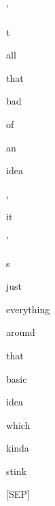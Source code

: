 \documentclass[varwidth=150mm]{standalone}
\begin{document}
\begin{CJK*}{UTF8}{gbsn}
{{{\colorbox{red!0.0}{\strut '} \colorbox{red!1.962546467781067}{\strut t} \colorbox{red!0.0}{\strut all} \colorbox{red!0.0}{\strut that} \colorbox{red!0.0}{\strut bad} \colorbox{red!0.0}{\strut of} \colorbox{red!0.0}{\strut an} \colorbox{red!1.2035356760025024}{\strut idea} \colorbox{red!4.886922836303711}{\strut ,} \colorbox{red!1.638393759727478}{\strut it} \colorbox{red!1.2365622520446777}{\strut '} \colorbox{red!1.4971991777420044}{\strut s} \colorbox{red!2.791412353515625}{\strut just} \colorbox{red!0.0}{\strut everything} \colorbox{red!0.0}{\strut around} \colorbox{red!3.3273770809173584}{\strut that} \colorbox{red!5.566688060760498}{\strut basic} \colorbox{red!3.2885966300964355}{\strut idea} \colorbox{red!3.613720655441284}{\strut which} \colorbox{red!5.9084601402282715}{\strut kinda} \colorbox{red!5.223268985748291}{\strut stink} \colorbox{red!1.883830189704895}{\strut [SEP]}
}}}
\end{CJK*}
\end{document}
